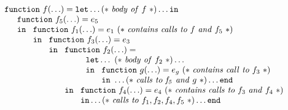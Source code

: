 \begin{equation}
\label{FunctionalCascadeFun}
\begin{array}{l}
  \mathtt{function}\ f (\ldots)= 
  \mathtt{let} \ldots (*\ \mathit{body\ of}\ f\ *)\ldots \mathtt{in}\\
  \quad \begin{array}{l}
          \mathtt{function}\ f_5(\ldots) = e_5\\ \mathtt{in}\  
          \begin{array}[t]{l}
            \mathtt{function}\ f_1(\ldots) = e_1\ 
                 (*\ \mathit{contains\ calls\ to}\ f\ \mathit{and}\ f_5\ *) \\
            \mathtt{in}\ 
            \begin{array}[t]{l}
              \mathtt{function}\ f_3(\ldots) = e_3\\ \mathtt{in}\ 
              \begin{array}[t]{l}
                \mathtt{function}\ f_2(\ldots) =\\
                \qquad
                  \begin{array}[t]{l}
                    \mathtt{let} \ldots\ (*\ \mathit{body\ of}\ f_2\ *)\ldots\\
                    \mathtt{in}\
                      \begin{array}[t]{l}
                        \mathtt{function}\ g(\ldots) = e_g\
                           (*\ \mathit{contains\ call\ to}\ f_3\ *)\\ 
                        \mathtt{in}\   \ldots 
                              (*\ \mathit{calls\ to\ f_5}\ \mathit{and}\ g\ *)
                        \ldots \mathtt{end}
                     \end{array}\\
                   \end{array}\\ 
                \mathtt{in}\
                \begin{array}[t]{l}
                  \mathtt{function}\ f_4(\ldots) = e_4\
                    (*\ \mathit{contains\ calls\ to}\ f_3\ 
                        \mathit{and}\ f_4\ *) \\
                   \mathtt{in} \ldots 
                      (*\ \mathit{calls\ to}\ f_1, f_2, f_4, f_5\ *)
                   \ldots \mathtt{end}
                \end{array}
              \end{array}
            \end{array}
          \end{array}
        \end{array}
  \end{array}
\end{equation}
